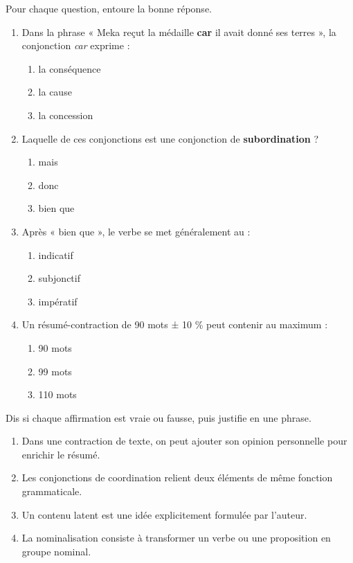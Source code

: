 \documentclass[11pt]{article}
\begin{document}
\begin{exercice}
Pour chaque question, entoure la bonne réponse.
\begin{enumerate}
\item Dans la phrase « Meka reçut la médaille \textbf{car} il avait donné ses terres », la conjonction \emph{car} exprime :
\begin{enumerate}
\item la conséquence \item la cause \item la concession
\end{enumerate}
\item Laquelle de ces conjonctions est une conjonction de \textbf{subordination} ?
\begin{enumerate}
\item mais \item donc \item bien que
\end{enumerate}
\item Après « bien que », le verbe se met généralement au :
\begin{enumerate}
\item indicatif \item subjonctif \item impératif
\end{enumerate}
\item Un résumé-contraction de 90 mots ± 10 \% peut contenir au maximum :
\begin{enumerate}
\item 90 mots \item 99 mots \item 110 mots
\end{enumerate}
\end{enumerate}
\end{exercice}

\begin{exercice}
Dis si chaque affirmation est vraie ou fausse, puis justifie en une phrase.
\begin{enumerate}
\item Dans une contraction de texte, on peut ajouter son opinion personnelle pour enrichir le résumé.
\item Les conjonctions de coordination relient deux éléments de même fonction grammaticale.
\item Un contenu latent est une idée explicitement formulée par l'auteur.
\item La nominalisation consiste à transformer un verbe ou une proposition en groupe nominal.
\end{enumerate}
\end{exercice}
\end{document}
